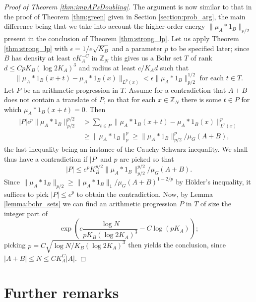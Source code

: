 \documentclass[12pt,a4paper,reqno]{amsart}
\numberwithin{equation}{section}
\theoremstyle{plain}
\theoremstyle{definition}
\renewcommand{\leq}{\leqslant}
\renewcommand{\geq}{\geqslant}
\def\Z{\mathbb{Z}}
\newcommand{\Zmod}[1]{\Z_{#1}} %
\providecommand{\abs}[1]{\lvert#1\rvert}
\providecommand{\norm}[1]{\lVert #1 \rVert}
\theoremstyle{plain}
\begin{document}
\begin{proof}[Proof of Theorem \ref{thm:impAPsDoubling}]
The argument is now similar to that in the proof of Theorem \ref{thm:green} given in Section \ref{section:prob_arg}, the main difference being that we take into account the higher-order energy $\norm{\mu_A*1_B}_{p/2}$ present in the conclusion of Theorem \ref{thm:strong_lp}. Let us apply Theorem \ref{thm:strong_lp} with $\epsilon = 1/e\sqrt{K_B}$ and a parameter $p$ to be specified later; since $B$ has density at least $cK_A^{-C}$ in $\Zmod{N}$ this gives us a Bohr set $T$ of rank $d \leq Cp K_B(\log 2K_A)^3$ and radius at least $c/K_A d$ such that 
\[ \norm{ \mu_A*1_B(x+t) - \mu_A*1_B(x) }_{L^p(x)} < \epsilon \norm{ \mu_A*1_B }_{p/2}^{1/2} \text{ for each $t \in T$}. \]
Let $P$ be an arithmetic progression in $T$. Assume for a contradiction that $A+B$ does not contain a translate of $P$, so that for each $x \in \Zmod{N}$ there is some $t \in P$ for which $\mu_A*1_B(x+t) = 0$. Then
\begin{align*}
\abs{P} \epsilon^p \norm{ \mu_A*1_B }_{p/2}^{p/2} &> \sum_{t \in P} \norm{\mu_A*1_B(x+t) - \mu_A*1_B(x)}_{L^p(x)}^p \\
&\geq \norm{\mu_A*1_B}_p^p \geq \norm{\mu_A*1_B}_{p/2}^p/\mu_G(A+B),
\end{align*}
the last inequality being an instance of the Cauchy-Schwarz inequality.
We shall thus have a contradiction if $\abs{P}$ and $p$ are picked so that
\[ \abs{P} \leq e^p K_B^{p/2} \norm{\mu_A*1_B}_{p/2}^{p/2}/\mu_G(A+B). \] 
Since $\norm{\mu_A*1_B}_{p/2} \geq \norm{\mu_A*1_B}_1/\mu_G(A+B)^{1-2/p}$ by H\"older's inequality, it suffices to pick $\abs{P} \leq e^p$ to obtain the contradiction. Now, by Lemma \ref{lemma:bohr_sets} we can find an arithmetic progression $P$ in $T$ of size the integer part of
\[ \exp\left( c \frac{\log{N}}{p K_B (\log{2K_A})^3} - C\log(p K_A) \right); \]
picking $p = C\sqrt{\log{N} / K_B (\log{2K_A})^3}$ then yields the conclusion, since $\abs{A+B} \leq N \leq CK_A^C \abs{A}$.
\end{proof}


\section{Further remarks}\label{section:remarks}
\end{document}
